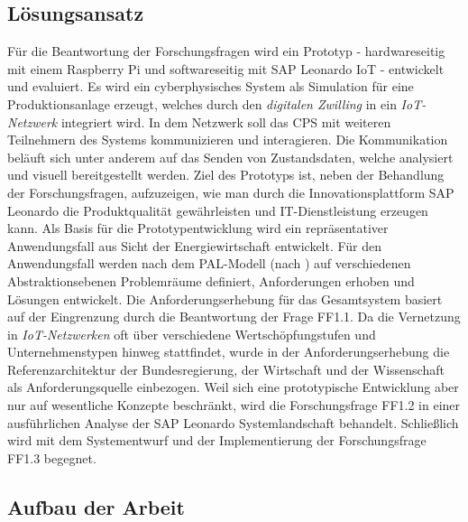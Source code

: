 \subsection{Lösungsansatz} \label{losung}

Für die Beantwortung der Forschungsfragen wird ein Prototyp - hardwareseitig mit einem Raspberry Pi und softwareseitig mit SAP Leonardo IoT - entwickelt und evaluiert. Es wird ein cyberphysisches System als Simulation für eine Produktionsanlage erzeugt, welches durch den \textit{digitalen Zwilling} in ein \textit{IoT-Netzwerk} integriert wird. In dem Netzwerk soll das CPS mit weiteren Teilnehmern des Systems kommunizieren und interagieren. Die Kommunikation beläuft sich unter anderem auf das Senden von Zustandsdaten, welche analysiert und visuell bereitgestellt werden. Ziel des Prototyps ist, neben der Behandlung der Forschungsfragen, aufzuzeigen, wie man durch die Innovationsplattform SAP Leonardo die Produktqualität gewährleisten und IT-Dienstleistung erzeugen kann. 
Als Basis für die Prototypentwicklung wird ein repräsentativer Anwendungsfall aus Sicht der Energiewirtschaft entwickelt. Für den Anwendungsfall werden nach dem PAL-Modell (nach \citet{Lauenroth2016}) auf verschiedenen Abstraktionsebenen Problemräume definiert, Anforderungen erhoben und Lösungen entwickelt. Die Anforderungserhebung für das Gesamtsystem basiert auf der Eingrenzung durch die Beantwortung der Frage FF1.1. Da die Vernetzung in \textit{IoT-Netzwerken} oft über verschiedene Wertschöpfungstufen und Unternehmenstypen hinweg stattfindet, wurde in der Anforderungserhebung die Referenzarchitektur der Bundesregierung, der Wirtschaft und der Wissenschaft als Anforderungsquelle einbezogen. Weil sich eine prototypische Entwicklung aber nur auf wesentliche Konzepte beschränkt, wird die Forschungsfrage FF1.2 in einer ausführlichen Analyse der SAP Leonardo Systemlandschaft behandelt. Schließlich wird mit dem Systementwurf und der Implementierung der Forschungsfrage FF1.3 begegnet. 

\subsection{Aufbau der Arbeit}

